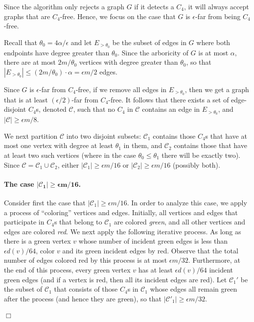 \documentclass{article}
\newcommand{\eps}{\epsilon}
\newcommand{\calC}{{\mathcal{C}}}
\newenvironment{proofof}[1]{\smallskip\noindent{\bf Proof of #1:}}%
        {\hspace*{\fill}$\Box$\par}
\newcommand{\commentt}[1]{ {}}
\begin{document}
\begin{proofof}{Theorem~\ref{thm:C4-ub}}
Since the algorithm only rejects a graph $G$ if it detects a $C_4$, it will always accept graphs that are $C_4$-free.
Hence, we focus on  the case that $G$ is $\eps$-far from being $C_4$-free.

Recall that $\theta_0 = 4\alpha/\epsilon$
and let $E_{>\theta_0}$ be the subset of edges in $G$ where both endpoints have degree greater than $\theta_0$. 
Since the arboricity of $G$ is at most $\alpha$,
there are at most $2m/\theta_0$ vertices with degree greater than $\theta_0$, so that $|E_{>\theta_0}| \leq (2m/\theta_0)\cdot \alpha=\eps m/2$ edges.

Since $G$ is $\eps$-far from $C_4$-free, if we remove all edges in $E_{>\theta_0}$, then we get a graph that is at least $(\eps/2)$-far from $C_4$-free. It follows that there exists a set of edge-disjoint $C_4$s, denoted $\calC$, such that
no $C_4$ in $\calC$ contains an edge in $E_{>\theta_0}$, and $|\calC| \geq \eps m/8$.

 We next  partition $\calC$ into two disjoint subsets: $\calC_1$ contains those $C_4$s that have at most one vertex with degree at least $\theta_1$ in them, and $\calC_2$ contains those that have at least two such vertices (where in the case $\theta_0\leq \theta_1$ there will be exactly two).  Since $\calC = \calC_1 \cup \calC_2$, either $|\calC_1| \geq \eps m/16$ or $|\calC_2| \geq \eps m/16$ (possibly both).

\paragraph{The case $\mathbf{|\calC_1| \geq \eps m/16}$.}
Consider first the case that $|\calC_1| \geq \eps m/16$. In order to analyze this case, we apply a process of ``coloring'' vertices and edges. Initially, all vertices and edges that participate in $C_4$s that belong to $\calC_1$ are colored \emph{green}, and all other vertices and edges are colored \emph{red}. We next apply the following iterative process. As long as there is a green vertex $v$ whose number of incident green edges is less than $\eps d(v)/64$, color $v$ and its green incident edges by red. Observe that the total number of edges colored red by this process is at most $\eps m/32$.
Furthermore, at the end of this process, every green vertex $v$ has at least $\eps d(v)/64$ incident green edges (and if a vertex is red, then all its incident edges are red).
Let $\calC_1'$ be the subset of $\calC_1$ that consists of those $C_4$s in $\calC_1$ whose edges all remain green after the process (and hence they are green), so that $|\calC'_1| \geq \eps m/32$.


\end{proofof}
\end{document}
